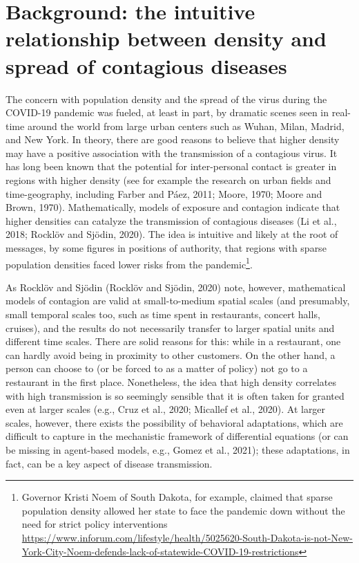 \documentclass[]{elsarticle} %
\begin{document}
\hypertarget{background-the-intuitive-relationship-between-density-and-spread-of-contagious-diseases}{%
\section{Background: the intuitive relationship between density and
spread of contagious
diseases}\label{background-the-intuitive-relationship-between-density-and-spread-of-contagious-diseases}}

The concern with population density and the spread of the virus during
the COVID-19 pandemic was fueled, at least in part, by dramatic scenes
seen in real-time around the world from large urban centers such as
Wuhan, Milan, Madrid, and New York. In theory, there are good reasons to
believe that higher density may have a positive association with the
transmission of a contagious virus. It has long been known that the
potential for inter-personal contact is greater in regions with higher
density (see for example the research on urban fields and
time-geography, including Farber and Páez, 2011; Moore, 1970; Moore and
Brown, 1970). Mathematically, models of exposure and contagion indicate
that higher densities can catalyze the transmission of contagious
diseases (Li et al., 2018; Rocklöv and Sjödin, 2020). The idea is
intuitive and likely at the root of messages, by some figures in
positions of authority, that regions with sparse population densities
faced lower risks from the pandemic\footnote{Governor Kristi Noem of
  South Dakota, for example, claimed that sparse population density
  allowed her state to face the pandemic down without the need for
  strict policy interventions
  \url{https://www.inforum.com/lifestyle/health/5025620-South-Dakota-is-not-New-York-City-Noem-defends-lack-of-statewide-COVID-19-restrictions}}.

As Rocklöv and Sjödin (Rocklöv and Sjödin, 2020) note, however,
mathematical models of contagion are valid at small-to-medium spatial
scales (and presumably, small temporal scales too, such as time spent in
restaurants, concert halls, cruises), and the results do not necessarily
transfer to larger spatial units and different time scales. There are
solid reasons for this: while in a restaurant, one can hardly avoid
being in proximity to other customers. On the other hand, a person can
choose to (or be forced to as a matter of policy) not go to a restaurant
in the first place. Nonetheless, the idea that high density correlates
with high transmission is so seemingly sensible that it is often taken
for granted even at larger scales (e.g., Cruz et al., 2020; Micallef et
al., 2020). At larger scales, however, there exists the possibility of
behavioral adaptations, which are difficult to capture in the
mechanistic framework of differential equations (or can be missing in
agent-based models, e.g., Gomez et al., 2021); these adaptations, in
fact, can be a key aspect of disease transmission.
\end{document}
